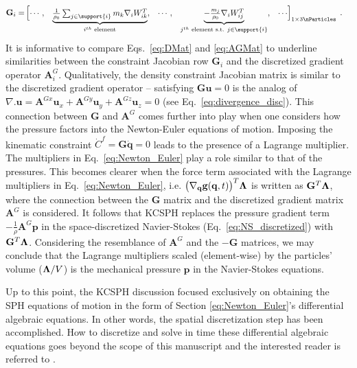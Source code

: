 \begin{align}\renewcommand{\arraystretch}{1.2}
\mathbf{G}_i=& \begin{bmatrix}
\cdots, & 
\smash[b]{\underbrace{\begin{matrix}\frac{1}{\rho_0}\sum_{j \in \support{i}} m_k \nabla_i W_{ik}^T \end{matrix}}_{i^{th}\text{ element} }} ,
&\cdots, &\smash[b]{\underbrace{\begin{matrix}-\frac{m_j}{\rho_0}\nabla_i W_{ij}^T\end{matrix}}_{j^{th}\text{ element s.t. }{j \in \support{i}} }}, & \cdots
\end{bmatrix}_{1\times 3\nParticles} \; . \label{eq:DMat}
\end{align}\\
It is informative to compare Eqs.~\ref{eq:DMat} and \ref{eq:AGMat} to underline similarities between the constraint Jacobian row  $\mathbf{G}_i$ and the discretized gradient operator $\mathbf{A}_i^G$. Qualitatively, the density constraint Jacobian matrix is similar to the discretized gradient operator -- satisfying  $\mathbf{G} \mathbf{u}=0$ is the analog of  $\nabla.\mathbf{u}=\mathbf{A}^{Gx} \mathbf{u}_x+\mathbf{A}^{Gy} \mathbf{u}_y+\mathbf{A}^{Gz}\mathbf{u}_z=0$ (see Eq.~\ref{eq:divergence_disc}). This connection between $\mathbf{G}$ and $\mathbf{A}^G$ comes further into play when one considers how the pressure factors into the Newton-Euler equations of motion. Imposing the kinematic constraint $\dot{C}^f=\mathbf{G} \mathbf{\dot{q}}=0$ leads to the presence of a Lagrange multiplier. The multipliers in Eq.~\ref{eq:Newton_Euler} play a role similar to that of the pressures. This becomes clearer when the force term associated with the Lagrange multipliers in Eq.~\ref{eq:Newton_Euler}, i.e. $\big(\nabla_{\bf q} {\bf g}({\bf q},t)\big)^T \bf{\Lambda}$ is written as $\mathbf{G}^T \bf{\Lambda}$, where the connection between the $\mathbf{G}$ matrix and the discretized gradient matrix $\mathbf{A}^G$ is considered. It follows that KCSPH replaces the pressure gradient term $-\frac{1}{\rho} \mathbf{A}^{G}\mathbf{p}$ in the space-discretized Navier-Stokes (Eq.~\ref{eq:NS_discretized}) with $\mathbf{G}^T \bf{\Lambda}$. Considering the resemblance of $\mathbf{A}^{G}$ and the $-\mathbf{G}$ matrices, we may conclude that the Lagrange multipliers scaled (element-wise)  by the particles' volume (${\bf\Lambda}/V$) is the mechanical pressure $\mathbf{p}$ in the Navier-Stokes equations. 

Up to this point, the KCSPH discussion focused exclusively on obtaining the SPH equations of motion in  the form of Section \ref{eq:Newton_Euler}'s differential algebraic equations. In other words, the spatial discretization step has been accomplished. How to discretize and solve in time these differential algebraic equations goes beyond the scope of this manuscript and the interested reader is referred to \cite{hammadConstrFluid2018}.

